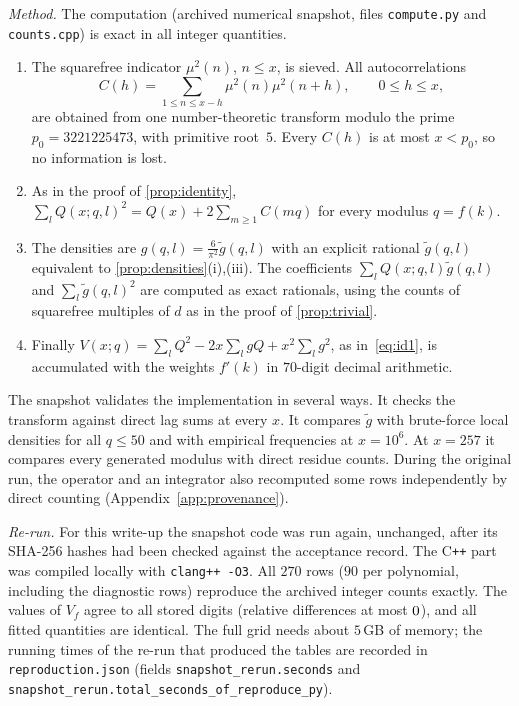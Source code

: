 \emph{Method.} The computation (archived numerical snapshot, files \texttt{compute.py} and \texttt{counts.cpp}) is exact in all integer quantities.
\begin{enumerate}[label=(\arabic*)]
\item The squarefree indicator $\mu^2(n)$, $n\le x$, is sieved. All autocorrelations
\[
C(h)=\sum_{1\le n\le x-h}\mu^2(n)\mu^2(n+h),\qquad0\le h\le x,
\]
are obtained from one number-theoretic transform modulo the prime $p_0=3221225473$, with primitive root~$5$. Every $C(h)$ is at most $x<p_0$, so no information is lost.
\item As in the proof of \cref{prop:identity}, $\sum_lQ(x;q,l)^2=Q(x)+2\sum_{m\ge1}C(mq)$ for every modulus $q=f(k)$.
\item The densities are $g(q,l)=\frac6{\pi^2}\tilde g(q,l)$ with an explicit rational $\tilde g(q,l)$ equivalent to \cref{prop:densities}(i),(iii). The coefficients $\sum_lQ(x;q,l)\tilde g(q,l)$ and $\sum_l\tilde g(q,l)^2$ are computed as exact rationals, using the counts of squarefree multiples of $d$ as in the proof of \cref{prop:trivial}.
\item Finally $V(x;q)=\sum_lQ^2-2x\sum_lgQ+x^2\sum_lg^2$, as in~\eqref{eq:id1}, is accumulated with the weights $f'(k)$ in $70$-digit decimal arithmetic.
\end{enumerate}
The snapshot validates the implementation in several ways. It checks the transform against direct lag sums at every $x$. It compares $\tilde g$ with brute-force local densities for all $q\le50$ and with empirical frequencies at $x=10^6$. At $x=257$ it compares every generated modulus with direct residue counts. During the original run, the operator and an integrator also recomputed some rows independently by direct counting (Appendix~\ref{app:provenance}).

\emph{Re-run.} For this write-up the snapshot code was run again, unchanged, after its SHA-256 hashes had been checked against the acceptance record. The C\texttt{++} part was compiled locally with \texttt{clang++ -O3}. All $270$ rows ($90$ per polynomial, including the diagnostic rows) reproduce the archived integer counts exactly. The values of $V_f$ agree to all stored digits (relative differences at most $0$), and all fitted quantities are identical. The full grid needs about $5$\,GB of memory; the running times of the re-run that produced the tables are recorded in \texttt{reproduction.json} (fields \texttt{snapshot\_rerun.seconds} and \texttt{snapshot\_rerun.total\_seconds\_of\_reproduce\_py}).

